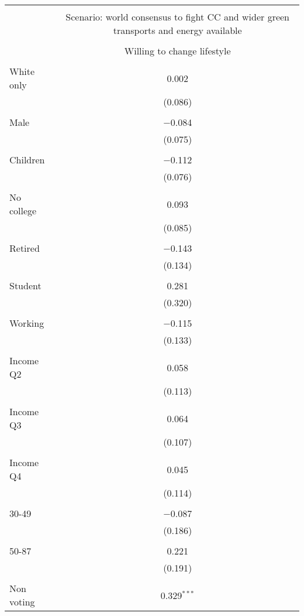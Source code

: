 
\begin{tabular}{@{\extracolsep{5pt}}lc} 
\\[-1.8ex]\hline 
\hline \\[-1.8ex] 
 & \multicolumn{1}{c}{Scenario: world consensus to fight CC and wider green transports and energy available} \\ 
\cline{2-2} 
\\[-1.8ex] & Willing to change lifestyle \\ 
\hline \\[-1.8ex] 
 White only & 0.002 \\ 
  & (0.086) \\ 
  & \\ 
 Male & $-$0.084 \\ 
  & (0.075) \\ 
  & \\ 
 Children & $-$0.112 \\ 
  & (0.076) \\ 
  & \\ 
 No college & 0.093 \\ 
  & (0.085) \\ 
  & \\ 
 Retired & $-$0.143 \\ 
  & (0.134) \\ 
  & \\ 
 Student & 0.281 \\ 
  & (0.320) \\ 
  & \\ 
 Working & $-$0.115 \\ 
  & (0.133) \\ 
  & \\ 
 Income Q2 & 0.058 \\ 
  & (0.113) \\ 
  & \\ 
 Income Q3 & 0.064 \\ 
  & (0.107) \\ 
  & \\ 
 Income Q4 & 0.045 \\ 
  & (0.114) \\ 
  & \\ 
 30-49 & $-$0.087 \\ 
  & (0.186) \\ 
  & \\ 
 50-87 & 0.221 \\ 
  & (0.191) \\ 
  & \\ 
 Non voting & 0.329$^{***}$ \\ 

\end{tabular}
